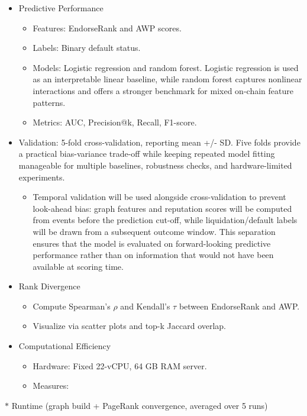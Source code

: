 \documentclass[12pt]{article}
\begin{document}
\begin{itemize}
\item[\textbullet] Predictive Performance
\begin{itemize}
\item[\textendash] Features: EndorseRank and AWP scores.
\item[\textendash] Labels: Binary default status.
\item[\textendash] Models: Logistic regression and random forest. Logistic regression is used as an interpretable linear baseline, while random forest captures nonlinear interactions and offers a stronger benchmark for mixed on-chain feature patterns.
\item[\textendash] Metrics: AUC, Precision@k, Recall, F1-score.
\end{itemize}
\item[\textbullet] Validation: 5-fold cross-validation, reporting mean +/- SD. Five folds provide a practical bias-variance trade-off while keeping repeated model fitting manageable for multiple baselines, robustness checks, and hardware-limited experiments.
\begin{itemize}
\item[\textendash] Temporal validation will be used alongside cross-validation to prevent look-ahead bias: graph features and reputation scores will be computed from events before the prediction cut-off, while liquidation/default labels will be drawn from a subsequent outcome window. This separation ensures that the model is evaluated on forward-looking predictive performance rather than on information that would not have been available at scoring time.
\end{itemize}
\item[\textbullet] Rank Divergence
\begin{itemize}
\item[\textendash] Compute Spearman's \emph{\(\rho\) }and Kendall's \emph{\(\tau\) }between EndorseRank and AWP.
\item[\textendash] Visualize via scatter plots and top-k Jaccard overlap.
\end{itemize}
\item[\textbullet] Computational Efficiency
\begin{itemize}
\item[\textendash] Hardware: Fixed 22-vCPU, 64 GB RAM server.
\item[\textendash] Measures:
\end{itemize}
\end{itemize}
\(\ast\) Runtime (graph build + PageRank convergence, averaged over 5 runs)
\end{document}
